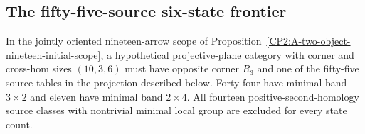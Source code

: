 \subsection{The fifty-five-source six-state frontier}

\begin{proposition}
\label{CP2:A-nineteen-ten-three-six-source-reduction}
In the jointly oriented nineteen-arrow scope of
Proposition~\ref{CP2:A-two-object-nineteen-initial-scope}, a hypothetical
projective-plane category with corner and cross-hom sizes $(10,3,6)$
must have opposite corner $R_3$ and one of the fifty-five source
tables in the projection described below.  Forty-four have minimal
band $3\times2$ and eleven have minimal band $2\times4$.
All fourteen positive-second-homology source classes with
nontrivial minimal local group are excluded for every state count.
\end{proposition}
